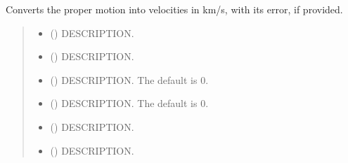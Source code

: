 \documentclass[letterpaper,10pt,english]{sphinxmanual}
\begin{document}

\begin{fulllineitems}
\label{\detokenize{analyzer:ggcas.analyzer.velocityConversion}}
\pysigstartsignatures
{}
\pysigstopsignatures
\sphinxAtStartPar
Converts the proper motion into velocities in km/s, with its error, if provided.
\begin{quote}\begin{description}
\begin{itemize}
\item {} 
\sphinxAtStartPar
{} () \textendash{} DESCRIPTION.

\item {} 
\sphinxAtStartPar
{} () \textendash{} DESCRIPTION.

\item {} 
\sphinxAtStartPar
{} (\sphinxstyleliteralemphasis{\sphinxupquote{, }}) \textendash{} DESCRIPTION. The default is 0.

\item {} 
\sphinxAtStartPar
{} (\sphinxstyleliteralemphasis{\sphinxupquote{, }}) \textendash{} DESCRIPTION. The default is 0.

\end{itemize}

\sphinxAtStartPar
\begin{itemize}
\item {} 
\sphinxAtStartPar
{} () \textendash{} DESCRIPTION.

\item {} 
\sphinxAtStartPar
{} () \textendash{} DESCRIPTION.

\end{itemize}


\end{description}\end{quote}

\end{fulllineitems}
\end{document}
